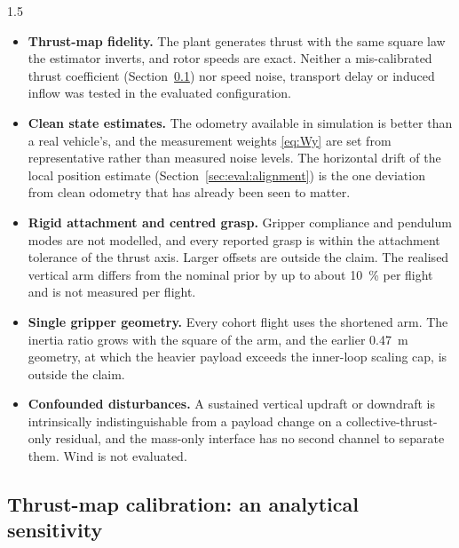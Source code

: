 \begin{spacing}{1.5}
\begin{itemize}
\item \textbf{Thrust-map fidelity.} The plant generates thrust with the same
square law the estimator inverts, and rotor speeds are exact. Neither a
mis-calibrated thrust coefficient (Section~\ref{sec:eval:thrustcal}) nor speed
noise, transport delay or induced inflow \cite{bangura2012} was tested in the
evaluated configuration.
\item \textbf{Clean state estimates.} The odometry available in simulation is
better than a real vehicle's, and the measurement weights \eqref{eq:Wy} are set
from representative rather than measured noise levels. The horizontal drift of
the local position estimate (Section~\ref{sec:eval:alignment}) is the one
deviation from clean odometry that has already been seen to matter.
\item \textbf{Rigid attachment and centred grasp.} Gripper compliance and
pendulum modes are not modelled, and every reported grasp is within the
attachment tolerance of the thrust axis. Larger offsets are outside the claim.
The realised vertical arm differs from the nominal prior by up to about
\SI{10}{\percent} per flight and is not measured per flight.
\item \textbf{Single gripper geometry.} Every cohort flight uses the shortened
arm. The inertia ratio grows with the square of the arm, and the earlier
\SI{0.47}{\meter} geometry, at which the heavier payload exceeds the inner-loop
scaling cap, is outside the claim.
\item \textbf{Confounded disturbances.} A sustained vertical updraft or downdraft
is intrinsically indistinguishable from a payload change on a
collective-thrust-only residual, and the mass-only interface has no second
channel to separate them. Wind is not evaluated.
\end{itemize}

\subsection{Thrust-map calibration: an analytical sensitivity}\label{sec:eval:thrustcal}


\end{spacing}
